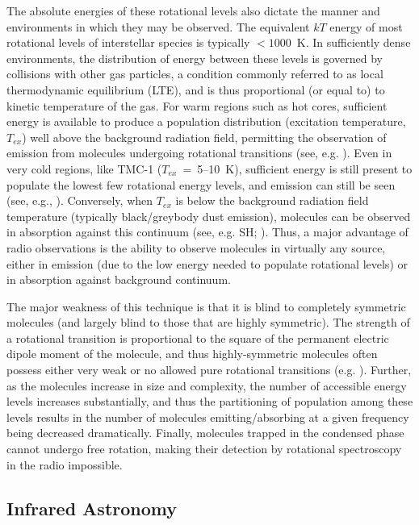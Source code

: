 \documentclass[twocolumn]{aastex631}
\begin{document}
The absolute energies of these rotational levels also dictate the manner and environments in which they may be observed.  The equivalent $kT$ energy of most rotational levels of interstellar species is typically $<1000$~K.  In sufficiently dense environments, the distribution of energy between these levels is governed by collisions with other gas particles, a condition commonly referred to as local thermodynamic equilibrium (LTE), and is thus proportional (or equal to) to kinetic temperature of the gas.  For warm regions such as hot cores, sufficient energy is available to produce a population distribution (excitation temperature, $T_{ex}$) well above the background radiation field, permitting the observation of emission from molecules undergoing rotational transitions (see, e.g. \citealt{Belloche:2013eb}).  Even in very cold regions, like TMC-1 ($T_{ex}$~=~5--10~K), sufficient energy is still present to populate the lowest few rotational energy levels, and emission can still be seen (see, e.g., \citealt{Kaifu:2004tk}).  Conversely, when $T_{ex}$ is below the background radiation field temperature (typically black/greybody dust emission), molecules can be observed in absorption against this continuum (see, e.g. SH; \citealt{Neufeld:2012gz}).    Thus, a major advantage of radio observations is the ability to observe molecules in virtually any source, either in emission (due to the low energy needed to populate rotational levels) or in absorption against background continuum.

The major weakness of this technique is that it is blind to completely symmetric molecules (and largely blind to those that are highly symmetric).  The strength of a rotational transition is proportional to the square of the permanent electric dipole moment of the molecule, and thus highly-symmetric molecules often possess either very weak or no allowed pure rotational transitions (e.g. ).  Further, as the molecules increase in size and complexity, the number of accessible energy levels increases substantially, and thus the partitioning of population among these levels results in the number of molecules emitting/absorbing at a given frequency being decreased dramatically.  Finally, molecules trapped in the condensed phase cannot undergo free rotation, making their detection by rotational spectroscopy in the radio impossible.

\subsection{Infrared Astronomy}
\label{detecting:infrared}
\end{document}
